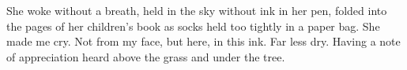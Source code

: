 

She woke without a breath, held in the sky without ink in her pen,
folded into the pages of her children's book as socks held too tightly
in a paper bag.  She made me cry.  Not from my face, but here, in this
ink.  Far less dry.  Having a note of appreciation heard above the
grass and under the tree.



\bye
